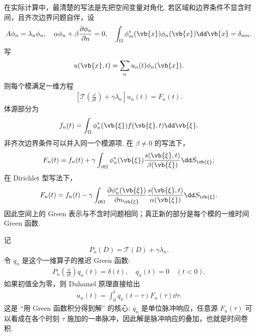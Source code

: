 在实际计算中，最清楚的写法是先把空间变量对角化. 若区域和边界条件不显含时间，且齐次边界问题自伴，设
\begin{align*}
	A\phi_n=\lambda_n\phi_n,
	\quad
	\alpha\phi_n+\beta\frac{\partial\phi_n}{\partial n}=0,
	\quad
	\int_\Omega\phi_m^*(\vb{x})\phi_n(\vb{x})\dd\vb{x}=\delta_{mn}.
\end{align*}
写
\begin{align*}
	u(\vb{x},t)=\sum_nu_n(t)\phi_n(\vb{x}).
\end{align*}
则每个模满足一维方程
\begin{align*}
	\left[\mathcal{T}\left(\frac{\dd}{\dd t}\right)+\gamma\lambda_n\right]u_n(t)=F_n(t).
\end{align*}
体源部分为
\begin{align*}
	f_n(t)=\int_\Omega\phi_n^*(\vb{\xi})f(\vb{\xi},t)\dd\vb{\xi}.
\end{align*}
非齐次边界条件可以并入同一个模源项. 在 $\beta\neq0$ 的写法下，
\begin{align*}
	F_n(t)=f_n(t)+\gamma\int_{\partial\Omega}\phi_n^*(\vb{\xi})
	\frac{s(\vb{\xi},t)}{\beta(\vb{\xi})}\dd S_{\vb{\xi}};
\end{align*}
在 Dirichlet 型写法下，
\begin{align*}
	F_n(t)=f_n(t)-\gamma\int_{\partial\Omega}
	\frac{\partial\phi_n^*(\vb{\xi})}{\partial n_{\vb{\xi}}}
	\frac{s(\vb{\xi},t)}{\alpha(\vb{\xi})}\dd S_{\vb{\xi}}.
\end{align*}
因此空间上的 Green 表示与不含时问题相同；真正新的部分是每个模的一维时间 Green 函数.

记
\begin{align*}
	P_n(D)=\mathcal{T}(D)+\gamma\lambda_n.
\end{align*}
令 $q_n$ 是这个一维算子的推迟 Green 函数:
\begin{align*}
	P_n\left(\frac{\dd}{\dd t}\right)q_n(t)=\delta(t),
	\quad q_n(t)=0\quad(t<0).
\end{align*}
如果初值全为零，则 Duhamel 原理直接给出
\begin{align*}
	u_n(t)=\int_0^tq_n(t-\tau)F_n(\tau)\dd\tau.
\end{align*}
这是 ``用 Green 函数积分得到解'' 的核心: $q_n$ 是单位脉冲响应，任意源 $F_n(\tau)$ 可以看成在各个时刻 $\tau$ 施加的一串脉冲，因此解是脉冲响应的叠加，也就是时间卷积.


